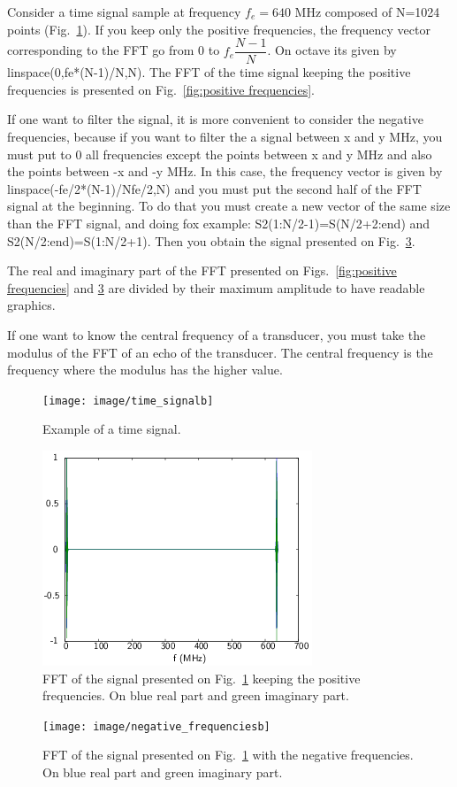 \documentclass[a4paper,twoside,11pt]{article}
\begin{document}
Consider a time signal sample at frequency $f_e=640$ MHz composed of N=1024 
points (Fig.~\ref{fig:time signal}). If you keep only the positive frequencies, 
the frequency vector corresponding to the FFT go from 0 to $f_e\dfrac{N-1}{N}$. 
On octave its given by linspace(0,fe*(N-1)/N,N). The FFT of the time signal 
keeping the positive frequencies is presented on Fig.~\ref{fig:positive 
frequencies}.

If one want to filter the signal, it is more convenient to consider the 
negative frequencies, because if you want to filter the a signal between x and y 
MHz, you must put to 0 all frequencies except the points between x and y MHz 
and also the points between -x and -y MHz. In this case, the frequency vector 
is given by linspace(-fe/2*(N-1)/Nfe/2,N) and you must put the second half of 
the FFT signal at the beginning. To do that you must create a new vector of the 
same size than the FFT signal, and doing fox example: S2(1:N/2-1)=S(N/2+2:end) 
and S2(N/2:end)=S(1:N/2+1). Then you obtain the signal presented on 
Fig.~\ref{fig:negative frequencies}.

The real and imaginary part of the FFT presented on Figs.~\ref{fig:positive 
frequencies} and \ref{fig:negative frequencies} are divided by their maximum 
amplitude to have readable graphics.

If one want to know the central frequency of a transducer, you must take the 
modulus of the FFT of an echo of the transducer. The central frequency is the 
frequency where the modulus has the higher value.

\begin{figure}[htb]
	\centering
		\texttt{[image: image/time\_signalb]}
	\caption{Example of a time signal.}
	\label{fig:time signal}
\end{figure}
\begin{figure}[htb]
	\centering
		\includegraphics{image/positive_frequenciesb}
	\caption{FFT of the signal presented on Fig.~\ref{fig:time signal} 
keeping the positive frequencies. On blue real part and green imaginary part.}
	\label{fig:positive frequencies}
\end{figure}
\begin{figure}[htb]
	\centering
		\texttt{[image: image/negative\_frequenciesb]}
	\caption{FFT of the signal presented on Fig.~\ref{fig:time signal} with 
the negative frequencies. On blue real part and green imaginary part.}
	\label{fig:negative frequencies}
\end{figure}
\end{document}
